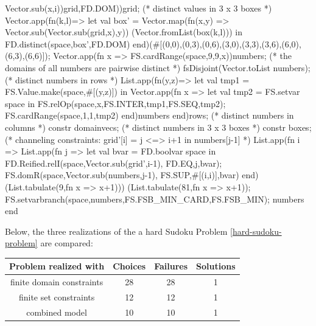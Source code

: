 \documentclass[a4paper]{scrartcl}
\begin{document}
\begin{myverbatim}
                                  Vector.sub(x,i))grid,FD.DOM))grid;
    (* distinct values in 3 x 3 boxes *)
     Vector.app(fn(k,l)=> 
       let
          val box' = Vector.map(fn(x,y) => 
                              Vector.sub(Vector.sub(grid,x),y))
                       (Vector.fromList(box(k,l)))
       in
          FD.distinct(space,box',FD.DOM)
      end)(#[(0,0),(0,3),(0,6),(3,0),(3,3),(3,6),(6,0),(6,3),(6,6)]);
     Vector.app(fn x => FS.cardRange(space,9,9,x))numbers;
    (* the domains of all numbers are pairwise distinct *)
     fsDisjoint(Vector.toList numbers);
    (* distinct numbers in rows *)
     List.app(fn(y,z)=>
        let 
           val tmp1 = FS.Value.make(space,#[(y,z)]) 
        in
           Vector.app(fn x => 
                let 
                   val tmp2 = FS.setvar space 
                in
                   FS.relOp(space,x,FS.INTER,tmp1,FS.SEQ,tmp2);
                   FS.cardRange(space,1,1,tmp2)
               end)numbers
        end)rows;
    (* distinct numbers in columns *)
     constr domainvecs;  
    (* distinct numbers in 3 x 3 boxes *)
     constr boxes;   
    (* channeling constraints: grid'[i] = j <=> i+1 in numbers[j-1] *)
     List.app(fn i => 
          List.app(fn j =>
             let
                val bvar = FD.boolvar space
             in  
                FD.Reified.relI(space,Vector.sub(grid',i-1),
                                     FD.EQ,j,bvar);
                FS.domR(space,Vector.sub(numbers,j-1),
                                     FS.SUP,#[(i,i)],bvar)
             end)
             (List.tabulate(9,fn x => x+1)))
         (List.tabulate(81,fn x => x+1));
     FS.setvarbranch(space,numbers,FS.FSB_MIN_CARD,FS.FSB_MIN); 
     numbers
  end

\end{myverbatim}


Below, the three realizations of the a hard Sudoku Problem
\ref{hard-sudoku-problem} are compared:\\[1.0cm]

\begin{tabular}{||c|| c | c | c||}
\hline
Problem realized with & Choices & Failures & Solutions \\
\hline
\hline
finite domain constraints & 28 & 28 & 1  \\
\hline
finite set constraints & 12 & 12  & 1   \\
\hline
combined model & 10  & 10 & 1 \\
\hline
\end{tabular}\\[1.0cm]
\end{document}
